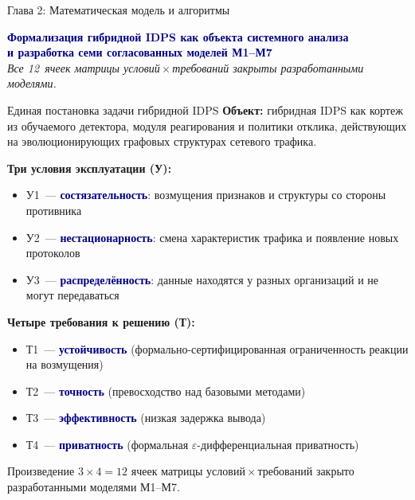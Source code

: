 \documentclass[10pt,aspectratio=169]{beamer}
\newcommand{\bn}[1]{\textcolor{navy}{\textbf{#1}}}
\begin{document}
\begin{frame}{Глава 2: Математическая модель и алгоритмы}
\vspace{1.5cm}
\begin{center}
{\Large\bn{Формализация гибридной IDPS как объекта системного
анализа\\
и разработка семи согласованных моделей М1--М7}}\\[1cm]

\textit{Все 12~ячеек матрицы условий\,$\times$\,требований
закрыты разработанными моделями.}
\end{center}
\end{frame}

\begin{frame}{Единая постановка задачи гибридной IDPS}
\small
\textbf{Объект:} гибридная IDPS как кортеж из обучаемого
детектора, модуля реагирования и политики отклика, действующих
на эволюционирующих графовых структурах сетевого трафика.
\smallskip

\textbf{Три условия эксплуатации (У):}
\begin{itemize}\setlength\itemsep{0pt}
\item У1~--- \bn{состязательность}: возмущения признаков и
структуры со стороны противника
\item У2~--- \bn{нестационарность}: смена характеристик
трафика и появление новых протоколов
\item У3~--- \bn{распределённость}: данные находятся у разных
организаций и не могут передаваться
\end{itemize}
\smallskip

\textbf{Четыре требования к решению (Т):}
\begin{itemize}\setlength\itemsep{0pt}
\item Т1~--- \bn{устойчивость} (формально-сертифицированная
ограниченность реакции на возмущения)
\item Т2~--- \bn{точность} (превосходство над базовыми
методами)
\item Т3~--- \bn{эффективность} (низкая задержка вывода)
\item Т4~--- \bn{приватность} (формальная
$\varepsilon$-дифференциальная приватность)
\end{itemize}
\smallskip

\begin{block}{}
\footnotesize Произведение $3\times4=12$ ячеек матрицы
условий\,$\times$\,требований закрыто разработанными
моделями М1--М7.
\end{block}
\end{frame}
\end{document}

